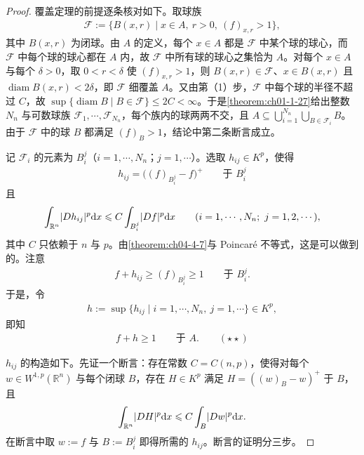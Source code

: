 \documentclass[../../main.tex]{subfiles}%
\begin{document}
\begin{proof}
覆盖定理的前提逐条核对如下。取球族
\begin{align*}
\mathcal{F}:=\bigl\{B(x,r)\mid x\in A,\ r>0,\ (f)_{x,r}>1\bigr\},
\end{align*}
其中 $B(x,r)$ 为闭球。由 $A$ 的定义，每个 $x\in A$ 都是 $\mathcal{F}$ 中某个球的球心，而 $\mathcal{F}$ 中每个球的球心都在 $A$ 内，故 $\mathcal{F}$ 中所有球的球心之集恰为 $A$。对每个 $x\in A$ 与每个 $\delta>0$，取 $0<r<\delta$ 使 $(f)_{x,r}>1$，则 $B(x,r)\in\mathcal{F}$、$x\in B(x,r)$ 且 $\operatorname{diam}B(x,r)<2\delta$，即 $\mathcal{F}$ 细覆盖 $A$。又由第（1）步，$\mathcal{F}$ 中每个球的半径不超过 $C$，故 $\sup\{\operatorname{diam}B\mid B\in\mathcal{F}\}\leqslant2C<\infty$。于是\cref{theorem:ch01-1-27}给出整数 $N_n$ 与可数球族 $\mathcal{F}_1,\cdots,\mathcal{F}_{N_n}$，每个族内的球两两不交，且 $A\subseteq\bigcup_{i=1}^{N_n}\bigcup_{B\in\mathcal{F}_i}B$。由于 $\mathcal{F}$ 中的球 $B$ 都满足 $(f)_B>1$，结论中第二条断言成立。%

记 $\mathcal{F}_i$ 的元素为 $B_i^j$（$i=1,\cdots,N_n$；$j=1,\cdots$）。选取 $h_{ij}\in K^p$，使得
\begin{align*}
h_{ij}=\bigl((f)_{B_i^j}-f\bigr)^+\qquad\text{于 }B_i^j
\end{align*}
且
\begin{align*}
\int_{\mathbb{R}^n}\lvert Dh_{ij}\rvert^p\diff x\leqslant C\int_{B_i^j}\lvert Df\rvert^p\diff x\qquad(i=1,\cdots,N_n;\ j=1,2,\cdots),
\end{align*}
其中 $C$ 只依赖于 $n$ 与 $p$。由\cref{theorem:ch04-4-7}与 Poincaré 不等式，这是可以做到的。注意%
\begin{align*}
f+h_{ij}\geqslant(f)_{B_i^j}\geqslant1\qquad\text{于 }B_i^j .
\end{align*}
于是，令
\begin{align*}
h:=\sup\{h_{ij}\mid i=1,\cdots,N_n,\ j=1,\cdots\}\in K^p ,
\end{align*}
即知
\begin{align*}
f+h\geqslant1\qquad\text{于 }A .\qquad(\star\star)
\end{align*}

$h_{ij}$ 的构造如下。先证一个断言：存在常数 $C=C(n,p)$，使得对每个 $w\in W^{1,p}(\mathbb{R}^n)$ 与每个闭球 $B$，存在 $H\in K^p$ 满足 $H=((w)_B-w)^+$ 于 $B$，且
\begin{align*}
\int_{\mathbb{R}^n}\lvert DH\rvert^p\mathrm{d} x\leqslant C\int_B\lvert Dw\rvert^p\mathrm{d} x .
\end{align*}
在断言中取 $w:=f$ 与 $B:=B_i^j$ 即得所需的 $h_{ij}$。断言的证明分三步。


\end{proof}
\end{document}
